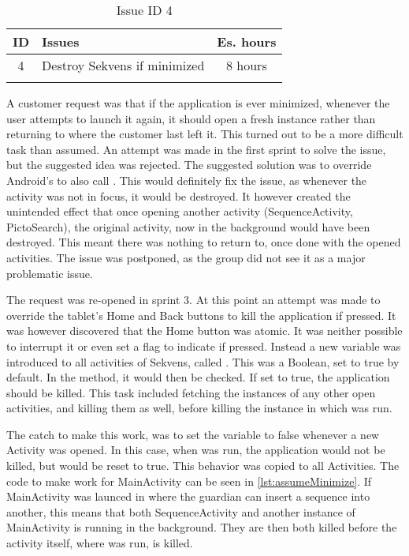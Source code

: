 \begin{longtable} { | c | p{12cm} | c | } 
\hline
	ID 	&	Issues	&		 Es. hours \\\hline
	4 	&	Destroy Sekvens if minimized	&	8 hours \\\hline
\caption{Issue ID 4}
\label{tab:spr3_homebuttonshoulddestroy}
\end{longtable}

A customer request was that if the application is ever minimized, whenever the user attempts to launch it again, it should open a fresh instance rather than returning to where the customer last left it. This turned out to be a more difficult task than assumed. An attempt was made in the first sprint to solve the issue, but the suggested idea was rejected. The suggested solution was to override Android's  to also call . This would definitely fix the issue, as whenever the activity was not in focus, it would be destroyed. It however created the unintended effect that once opening another activity (SequenceActivity, PictoSearch), the original activity, now in the background would have been destroyed. This meant there was nothing to return to, once done with the opened activities. The issue was postponed, as the group did not see it as a major problematic issue.

The request was re-opened in sprint 3. At this point an attempt was made to override the tablet's Home and Back buttons to kill the application if pressed. It was however discovered that the Home button was atomic. It was neither possible to interrupt it or even set a flag to indicate if pressed. Instead a new variable was introduced to all activities of Sekvens, called . This was a Boolean, set to true by default. In the  method, it would then be checked. If set to true, the application should be killed. This task included fetching the instances of any other open activities, and killing them as well, before killing the instance in which  was run.

The catch to make this work, was to set the variable to false whenever a new Activity was opened. In this case, when  was run, the application would not be killed, but  would be reset to true. This behavior was copied to all Activities. The  code to make  work for MainActivity can be seen in \ref{lst:assumeMinimize}. If MainActivity was launced in  where the guardian can insert a sequence into another, this means that both SequenceActivity and another instance of MainActivity is running in the background. They are then both killed before the activity itself, where  was run, is killed.


